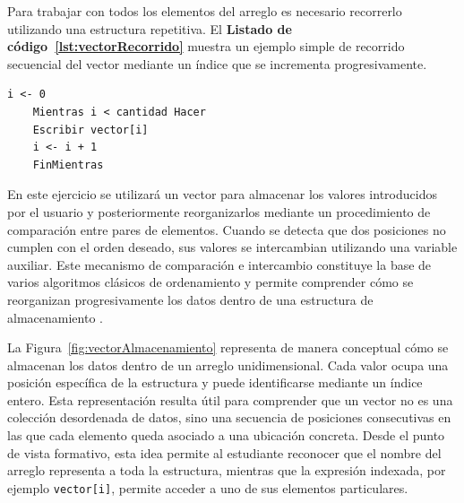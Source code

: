 \documentclass[12pt,twoside]{book}
\begin{document}
					Para trabajar con todos los elementos del arreglo es necesario recorrerlo utilizando una estructura repetitiva. El \textbf{Listado de código~\ref{lst:vectorRecorrido}} muestra un ejemplo simple de recorrido secuencial del vector mediante un índice que se incrementa progresivamente.
					
					\begin{lstlisting}[style=upsamStyle,caption={Recorrido secuencial de un vector},label={lst:vectorRecorrido}]
	i <- 0
	Mientras i < cantidad Hacer
	Escribir vector[i]
	i <- i + 1
	FinMientras \end{lstlisting}
					
					En este ejercicio se utilizará un vector para almacenar los valores introducidos por el usuario y posteriormente reorganizarlos mediante un procedimiento de comparación entre pares de elementos. Cuando se detecta que dos posiciones no cumplen con el orden deseado, sus valores se intercambian utilizando una variable auxiliar. Este mecanismo de comparación e intercambio constituye la base de varios algoritmos clásicos de ordenamiento y permite comprender cómo se reorganizan progresivamente los datos dentro de una estructura de almacenamiento \cite{Cormen2022Introduction}.
					
					La Figura~\ref{fig:vectorAlmacenamiento} representa de manera conceptual cómo se almacenan los datos dentro de un arreglo unidimensional. Cada valor ocupa una posición específica de la estructura y puede identificarse mediante un índice entero. Esta representación resulta útil para comprender que un vector no es una colección desordenada de datos, sino una secuencia de posiciones consecutivas en las que cada elemento queda asociado a una ubicación concreta. Desde el punto de vista formativo, esta idea permite al estudiante reconocer que el nombre del arreglo representa a toda la estructura, mientras que la expresión indexada, por ejemplo \texttt{vector[i]}, permite acceder a uno de sus elementos particulares.
					
\end{document}
